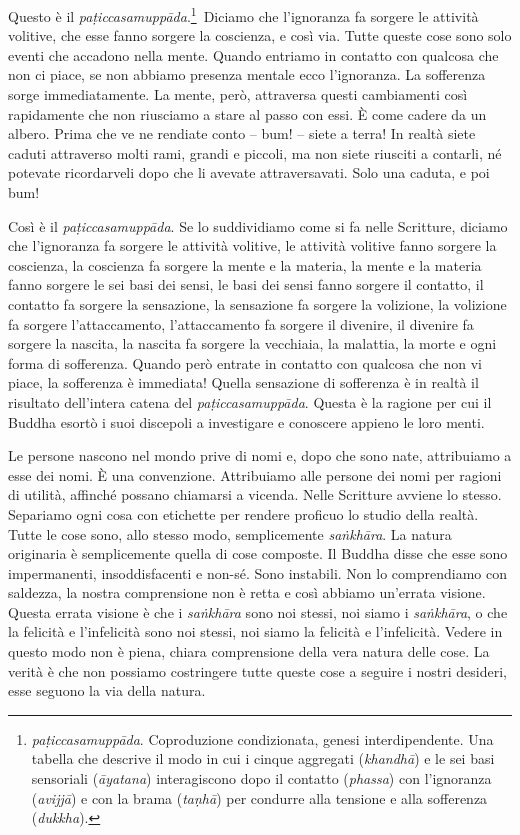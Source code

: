 Questo è il \emph{paṭiccasamuppāda}.\footnote{\emph{paṭiccasamuppāda}.
  Coproduzione condizionata, genesi interdipendente. Una tabella che
  descrive il modo in cui i cinque aggregati (\emph{khandhā}) e le sei
  basi sensoriali (\emph{āyatana}) interagiscono dopo il contatto
  (\emph{phassa}) con l'ignoranza (\emph{avijjā}) e con la brama
  (\emph{taṇhā}) per condurre alla tensione e alla sofferenza
  (\emph{dukkha}).}~Diciamo che l'ignoranza fa sorgere le attività
volitive, che esse fanno sorgere la coscienza, e così via. Tutte queste
cose sono solo eventi che accadono nella mente. Quando entriamo in
contatto con qualcosa che non ci piace, se non abbiamo presenza mentale
ecco l'ignoranza. La sofferenza sorge immediatamente. La mente, però,
attraversa questi cambiamenti così rapidamente che non riusciamo a stare
al passo con essi. È come cadere da un albero. Prima che ve ne rendiate
conto -- bum! -- siete a terra! In realtà siete caduti attraverso molti
rami, grandi e piccoli, ma non siete riusciti a contarli, né potevate
ricordarveli dopo che li avevate attraversavati. Solo una caduta, e poi
bum!

Così è il \emph{paṭiccasamuppāda}. Se lo suddividiamo come si fa nelle
Scritture, diciamo che l'ignoranza fa sorgere le attività volitive, le
attività volitive fanno sorgere la coscienza, la coscienza fa sorgere la
mente e la materia, la mente e la materia fanno sorgere le sei basi dei
sensi, le basi dei sensi fanno sorgere il contatto, il contatto fa
sorgere la sensazione, la sensazione fa sorgere la volizione, la
volizione fa sorgere l'attaccamento, l'attaccamento fa sorgere il
divenire, il divenire fa sorgere la nascita, la nascita fa sorgere la
vecchiaia, la malattia, la morte e ogni forma di sofferenza. Quando però
entrate in contatto con qualcosa che non vi piace, la sofferenza è
immediata! Quella sensazione di sofferenza è in realtà il risultato
dell'intera catena del \emph{paṭiccasamuppāda}. Questa è la ragione per
cui il Buddha esortò i suoi discepoli a investigare e conoscere appieno
le loro menti.

Le persone nascono nel mondo prive di nomi e, dopo che sono nate,
attribuiamo a esse dei nomi. È una convenzione. Attribuiamo alle persone
dei nomi per ragioni di utilità, affinché possano chiamarsi a vicenda.
Nelle Scritture avviene lo stesso. Separiamo ogni cosa con etichette per
rendere proficuo lo studio della realtà. Tutte le cose sono, allo stesso
modo, semplicemente \emph{saṅkhāra}. La natura originaria è
semplicemente quella di cose composte. Il Buddha disse che esse sono
impermanenti, insoddisfacenti e non-sé. Sono instabili. Non lo
comprendiamo con saldezza, la nostra comprensione non è retta e così
abbiamo un'errata visione. Questa errata visione è che i \emph{saṅkhāra}
sono noi stessi, noi siamo i \emph{saṅkhāra}, o che la felicità e
l'infelicità sono noi stessi, noi siamo la felicità e l'infelicità.
Vedere in questo modo non è piena, chiara comprensione della vera natura
delle cose. La verità è che non possiamo costringere tutte queste cose a
seguire i nostri desideri, esse seguono la via della natura.

